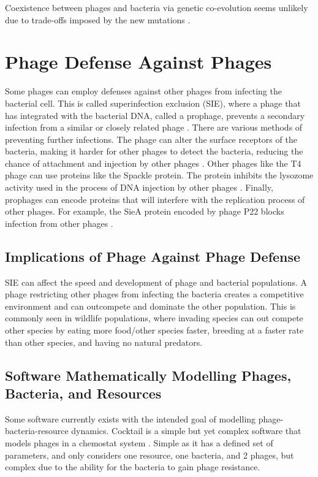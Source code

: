 Coexistence between phages and bacteria via genetic co-evolution seems unlikely due to trade-offs imposed by the new mutations \cite{bullOptimalityModelsPhage2006}. 


\section{Phage Defense Against Phages}
Some phages can employ defenses against other phages from infecting the bacterial cell. 
This is called superinfection exclusion (SIE), where a phage that has integrated with the bacterial DNA, called a prophage, prevents a secondary infection from a similar or closely related phage \cite{patelAntiphageDefenceInhibition2024}. 
There are various methods of preventing further infections. 
The phage can alter the surface receptors of the bacteria, making it harder for other phages to detect the bacteria, reducing the chance of attachment and injection by other phages \cite{bucherPhageMachineSIEence2024}. 
Other phages like the T4 phage can use proteins like the Spackle protein. 
The protein inhibits the lysozome activity used in the process of DNA injection by other phages \cite{bucherPhageMachineSIEence2024, kanamaruStructureFunctionT42020}. 
Finally, prophages can encode proteins that will interfere with the replication process of other phages. 
For example, the SieA protein encoded by phage P22 blocks infection from other phages \cite{leavittBacteriophageP22SieAmediated2024}. 

\subsection{Implications of Phage Against Phage Defense}
SIE can affect the speed and development of phage and bacterial populations. A phage restricting other phages from infecting the bacteria creates a competitive environment and can outcompete and dominate the other population. 
This is commonly seen in wildlife populations, where invading species can out compete other species by eating more food/other species faster, breeding at a faster rate than other species, and having no natural predators. 

\subsection{Software Mathematically Modelling Phages, Bacteria, and Resources}
Some software currently exists with the intended goal of modelling phage-bacteria-resource dynamics. 
Cocktail is a simple but yet complex software that models phages in a chemostat system \cite{nilssonCocktailComputerProgram2022}. 
Simple as it has a defined set of parameters, and only considers one resource, one bacteria, and 2 phages, but complex due to the ability for the bacteria to gain phage resistance. 

